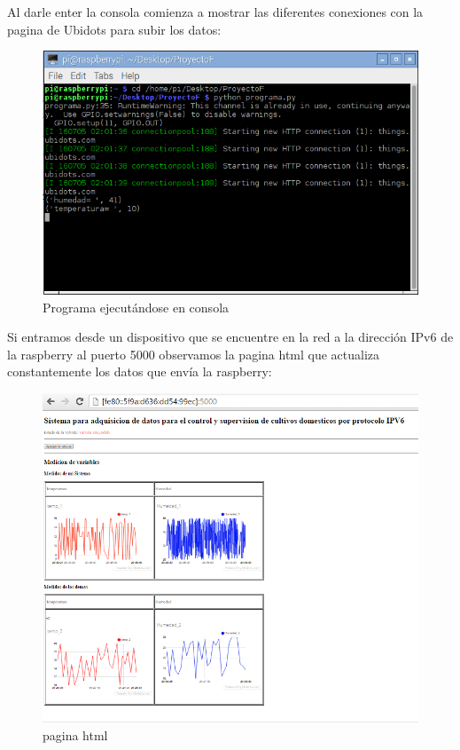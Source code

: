 \documentclass[10pt]{article}\usepackage[]{graphicx}\usepackage[]{color}
\begin{document}
Al darle enter la consola comienza a mostrar las diferentes conexiones con la pagina de Ubidots para subir los datos: 

		\begin{figure}[H] 
			\centering
			\includegraphics[scale=0.7]{eje2}  
			\caption{Programa ejecutándose en consola}	
		\end{figure}
		
Si entramos desde un dispositivo que se encuentre en la red a la dirección IPv6 de la raspberry al puerto 5000 observamos la pagina html que actualiza constantemente los datos que envía la raspberry: 

		\begin{figure}[H] 
			\centering
			\includegraphics[scale=0.7]{html3}  
			\caption{pagina html}	
		\end{figure}
\end{document}
